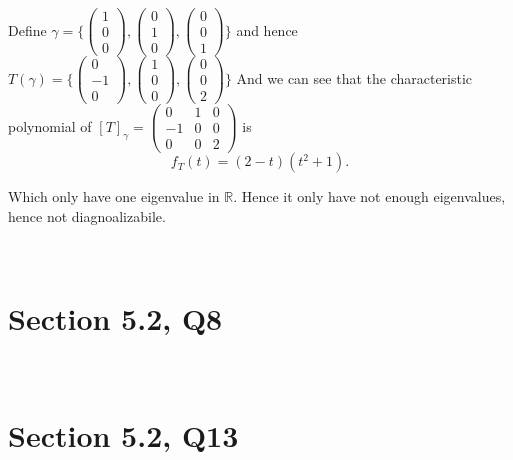 \documentclass[12pt]{article}%
\begin{document}
Define $\gamma=\{ \begin{pmatrix}1\\0\\0\end{pmatrix} , \begin{pmatrix}0\\1\\0\end{pmatrix}, \begin{pmatrix}0\\0\\1\end{pmatrix} \}$ and hence $T(\gamma)=\{ \begin{pmatrix}0\\-1\\0\end{pmatrix}, \begin{pmatrix}1\\0\\0\end{pmatrix}, \begin{pmatrix}0\\0\\2\end{pmatrix} \}$
And we can see that the characteristic polynomial of $[T]_\gamma=\begin{pmatrix}0&1&0\\-1&0&0\\0&0&2\end{pmatrix}$ is $$f_{T}(t)=(2-t)(t^2+1).$$

Which only have one eigenvalue in $\mathbb{R}.$ Hence it only have not enough eigenvalues, hence not diagnoalizabile.




~\ 






\section{Section 5.2, Q8}

~\ 






\section{Section 5.2, Q13}

~\ 
\end{document}
